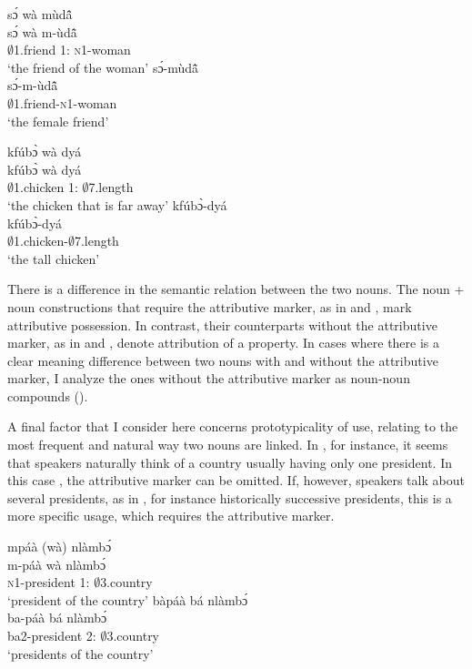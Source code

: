 \ea\label{woman}
\ea \label{woman1}
  \glll   sɔ́ wà mùdã̂ \\
  sɔ́ wà m-ùdã̂ \\
               $\emptyset$1.friend 1:{\ATT} \textsc{n}1-woman \\
    \trans `the friend of the woman'
\ex\label{woman2}
 \glll  sɔ́-mùdã̂ \\
       sɔ́-m-ùdã̂ \\
          $\emptyset$1.friend-\textsc{n}1-woman \\
    \trans `the female friend'
\z
\z

\ea\label{chick}
\ea \label{chick1}
  \glll    kfúbɔ̀ wà dyá \\
  kfúbɔ̀ wà dyá \\
              $\emptyset$1.chicken 1:{\ATT} $\emptyset$7.length \\
    \trans `the chicken that is far away'
\ex\label{chick2}
 \glll     kfúbɔ̀-dyá \\
   kfúbɔ̀-dyá \\
            $\emptyset$1.chicken-$\emptyset$7.length   \\
    \trans `the tall chicken'
\z
\z

There is a difference in the semantic relation between the two nouns. The noun + noun constructions that require the attributive marker, as in  and , mark attributive possession. In contrast, their counterparts without the attributive marker, as in  and , denote attribution of a property. In cases where there is a clear meaning difference between two nouns with and without the attributive marker, I analyze the ones without the attributive marker as noun-noun compounds ().




A final factor that I consider here concerns prototypicality of use, relating to the most frequent and natural way two nouns are linked. In , for instance, it seems that speakers naturally think of a country usually having only one president. In this case , the attributive marker can be omitted. If, however, speakers talk about several presidents, as in , for instance historically successive presidents, this is a more specific usage, which requires the attributive marker.

\ea\label{country}
\ea \label{country1}
  \glll    mpáà (wà) nlàmbɔ́ \\
  m-páà wà nlàmbɔ́ \\
               \textsc{n}1-president 1:{\ATT} $\emptyset$3.country  \\
    \trans `president of the country'
\ex\label{country2}
 \glll     bàpáà bá nlàmbɔ́ \\
 ba-páà bá nlàmbɔ́ \\
               ba2-president 2:{\ATT} $\emptyset$3.country \\
    \trans `presidents of the country'
\z
\z




